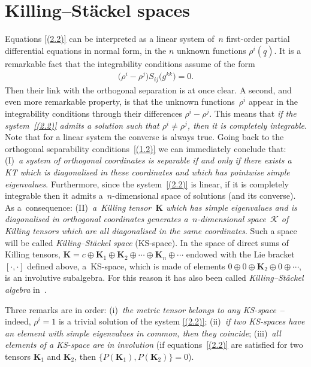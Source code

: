 \documentclass[10pt,a4paper]{amsart}
\def\bs{\boldsymbol}
\numberwithin{equation}{section}
\providecommand{\cal}{\mathcal}
\begin{document}
\section {Killing--St\"ackel spaces}\label{section3}

Equations \eqref{(2.2)} can be interpreted as a linear system of~$n$ f\/irst-order partial dif\/ferential equations in normal form, in the $n$ unknown functions $\rho^i(\underline q)$. It is a remarkable fact that the integrability conditions assume of the form
\begin{gather*}
\big(\rho^i-\rho^j\big) S_{ij}\big(g^{kk}\big)=0.
\end{gather*}
Then their link with the orthogonal separation is at once clear. A second, and even more remarkable property, is that the unknown functions~$\rho^i$ appear in the integrability conditions through their dif\/ferences $\rho^i-\rho^j$. This means that
{\it if the system~\eqref{(2.2)} admits a solution such that $\rho^i\neq\rho^j$, then it is completely integrable}. Note that for a linear system the converse is always true. Going back to the orthogonal separability conditions~\eqref{(1.2)} we can immediately conclude that: (I)~{\it a system of orthogonal coordinates is separable if and only if there exists a KT which is diagonalised in these coordinates and which has pointwise simple eigenvalues}. Furthermore, since the system~\eqref{(2.2)} is linear, if it is completely integrable then it admits a~$n$-dimensional space of solutions (and its converse). As a~consequence: (II)~{\it a~Killing tensor~$\bs K$ which has simple eigenvalues and is diagonalised in orthogonal coordinates generates a~$n$-dimensional spa\-ce~$\cal K$ of Killing tensors which are all diagonalised in the same coordinates}. Such a space will be called {\it Killing--St\"ackel space} (KS-space). In the space of direct sums of Killing tensors, ${\bs K}=c \oplus \bs K_1\oplus \bs K_2\oplus \cdots \oplus \bs K_n\oplus\cdots$ endowed with the Lie bracket $[\cdot,\cdot]$ def\/ined above, a~KS-space, which is made of elements $0\oplus 0\oplus \bs K_2\oplus 0\oplus\cdots$, is an involutive subalgebra. For this reason it has also been called {\it Killing--St\"ackel algebra} in~\cite{BCR-2002a,BCR-2002b}.

Three remarks are in order: (i)~{\it the metric tensor belongs to any KS-space}~-- indeed, $\rho^i=1$ is a trivial solution of the system \eqref{(2.2)}; (ii)~{\it if two KS-spaces have an element with simple eigenvalues in common,
then they coincide}; (iii)~{\it all elements of a KS-space are in involution}
(if equations~\eqref{(2.2)} are satisf\/ied for two tensors $\bs K_1$ and $\bs K_2$, then $\{P(\bs K_1),P(\bs K_2)\}=0$).
\end{document}
